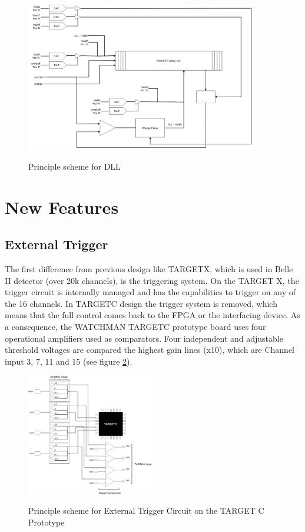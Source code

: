 \begin{figure}[H]
\centering
\includegraphics[width=0.9\textwidth]{figures/dll.png}\\
\caption{\label{fig:dll} Principle scheme for DLL}
\end{figure}

\newpage
\section{New Features}
\subsection{External Trigger}
The first difference from previous design like TARGETX, which is used in Belle II detector (over 20k channels), is the triggering system. On the TARGET X, the trigger circuit is internally managed and has the capabilities to trigger on any of the 16 channels. In TARGETC design the trigger system is removed, which means that the full control comes back to the FPGA or the interfacing device. As a consequence, the WATCHMAN TARGETC prototype board uses four operational amplifiers used as comparators. Four independent and adjustable threshold voltages are compared the highest gain lines (x10), which are Channel input 3, 7, 11 and 15 (see figure \ref{fig:TC_trigger}).

\begin{figure}[H]
\centering
\includegraphics[width=0.5\textwidth]{figures/ProtoTriggerSmall.png}\\
\caption{\label{fig:TC_trigger} Principle scheme for External Trigger Circuit on the TARGET C Prototype}
\end{figure}

